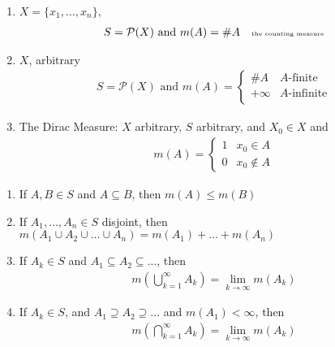 \begin{example}
	\begin{enumerate}
		\item $X = \{x_1, \ldots, x_n\}$,
			\begin{align*}
				S = \mathcal{P}(X) \text{ and } m(A) = \#A \quad \text{\tiny the counting measure}
			\end{align*} 
		\item $X$, arbitrary
			\begin{align*}
				S = \mathcal{P}(X) \text{ and } m(A) = 
				\begin{cases}
					\#A & A\text{-finite} \\
					+\infty & A\text{-infinite} \\
				\end{cases}
			\end{align*} 

		\item The Dirac Measure:
			$X$ arbitrary, $S$ arbitrary, and $X_0 \in X$ and 
			\begin{align*}
				m(A) = 
				\begin{cases}
					1 & x_0 \in A \\
					0 & x_0 \notin A
				\end{cases}
			\end{align*}
	\end{enumerate}
\end{example}


\begin{definition}
	\begin{enumerate}
		\item If $A,B \in S$  and $A \subseteq B$, then $m(A) \leq m(B)$
		\item If  $A_1, \ldots, A_n \in S$ disjoint, then 
			$m(A_1 \cup A_2 \cup \ldots \cup A_n) = m(A_1) + \ldots + m(A_n)$
		\item If  $A_k \in S$ and $A_1 \subseteq A_2 \subseteq \ldots$, then
			\begin{align*}
				m(\bigcup_{k=1}^{\infty} A_k ) = \lim_{k \to \infty} m(A_k)
			\end{align*} 
		\item If $A_k \in S$, and $A_1 \supseteq A_2 \supseteq \ldots$ and $m(A_1) < \infty$,
			then  
			 \begin{align*}
				m(\bigcap_{k=1}^{\infty} A_k) = \lim_{k \to \infty}  m(A_k)
			\end{align*} 
	\end{enumerate}
\end{definition}

